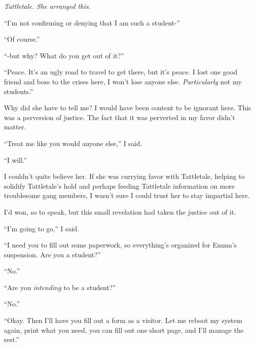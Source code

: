 \emph{Tattletale.  She arranged this}.



``I'm not confirming or denying that I am such a student-''



``Of course.''



``-but why?  What do you get out of it?''



``Peace.  It's an ugly road to travel to get there, but it's peace.  I lost one good friend and boss to the crises here, I won't lose anyone else.  \emph{Particularly} not my students.''



Why did she have to tell me?  I would have been content to be ignorant here.  This was a perversion of justice.  The fact that it was perverted in my favor didn't matter.



``Treat me like you would anyone else,'' I said.



``I will.''



I couldn't quite believe her.  If she was currying favor with Tattletale, helping to solidify Tattletale's hold and perhaps feeding Tattletale information on more troublesome gang members, I wasn't sure I could trust her to stay impartial here.



I'd won, so to speak, but this small revelation had taken the justice out of it.



``I'm going to go,'' I said.



``I need you to fill out some paperwork, so everything's organized for Emma's suspension.  Are you a student?''



``No.''



``Are you \emph{intending} to be a student?''



``No.''



``Okay.  Then I'll have you fill out a form as a visitor.  Let me reboot my system again, print what you need, you can fill out one short page, and I'll manage the rest.''




